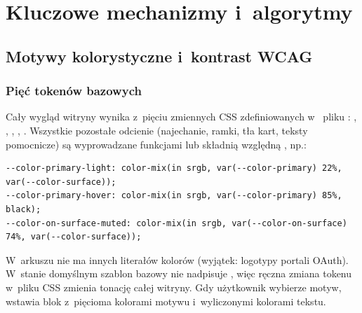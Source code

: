\chapter{Kluczowe mechanizmy i~algorytmy}

\section{Motywy kolorystyczne i~kontrast WCAG}

\subsection{Pięć tokenów bazowych}
Cały wygląd witryny wynika z~pięciu zmiennych CSS zdefiniowanych w~ pliku
: , ,
, , . Wszystkie
pozostałe odcienie (najechanie, ramki, tła kart, teksty pomocnicze) są wyprowadzane
funkcjami  lub składnią względną , np.:

\begin{lstlisting}
--color-primary-light: color-mix(in srgb, var(--color-primary) 22%, var(--color-surface));
--color-primary-hover: color-mix(in srgb, var(--color-primary) 85%, black);
--color-on-surface-muted: color-mix(in srgb, var(--color-on-surface) 74%, var(--color-surface));
\end{lstlisting}

W~arkuszu nie ma innych literałów kolorów (wyjątek: logotypy portali OAuth). W~stanie domyślnym szablon bazowy nie nadpisuje , więc
ręczna zmiana tokenu w~pliku CSS zmienia tonację całej witryny. Gdy użytkownik wybierze
motyw,  wstawia blok  z~pięcioma kolorami motywu i~wyliczonymi
kolorami tekstu.

